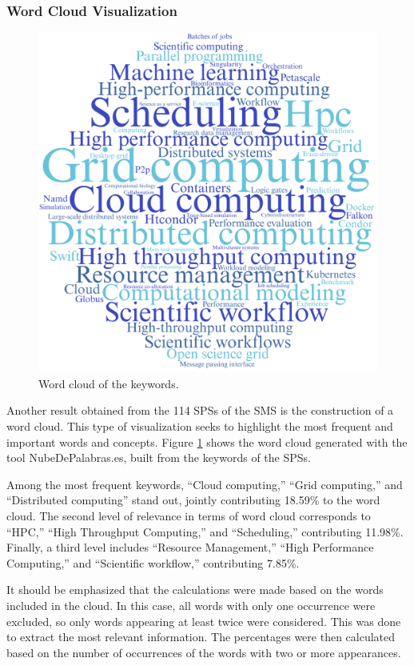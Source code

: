 \subsubsection{Word Cloud Visualization}

\begin{figure}[htbp]
	\centering
	\vspace{10pt}
	\includegraphics[scale=0.05]{resources/figures/wordcloud.png}
	\vspace{6pt}
	\caption{Word cloud of the keywords.}
	\label{fig:WordCloud}
\end{figure}

Another result obtained from the 114 SPSs of the SMS is the construction of a word cloud. This type of visualization seeks to highlight the most frequent and important words and concepts. Figure \ref{fig:WordCloud} shows the word cloud generated with the tool NubeDePalabras.es, built from the keywords of the SPSs.

Among the most frequent keywords, ``Cloud computing,'' ``Grid computing,'' and ``Distributed computing'' stand out, jointly contributing 18.59\% to the word cloud. The second level of relevance in terms of word cloud corresponds to ``HPC,'' ``High Throughput Computing,'' and ``Scheduling,'' contributing 11.98\%. Finally, a third level includes ``Resource Management,'' ``High Performance Computing,'' and ``Scientific workflow,'' contributing 7.85\%.

It should be emphasized that the calculations were made based on the words included in the cloud. In this case, all words with only one occurrence were excluded, so only words appearing at least twice were considered. This was done to extract the most relevant information. The percentages were then calculated based on the number of occurrences of the words with two or more appearances.
